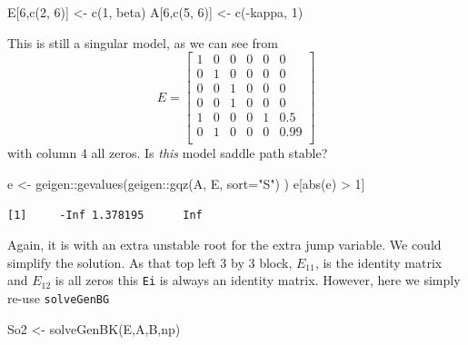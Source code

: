\documentclass[
  letterpaper,
]{book}
\newenvironment{Shaded}{\begin{snugshade}}{\end{snugshade}}
\newcommand{\AttributeTok}[1]{\textcolor[rgb]{0.40,0.45,0.13}{#1}}
\newcommand{\DecValTok}[1]{\textcolor[rgb]{0.68,0.00,0.00}{#1}}
\newcommand{\FunctionTok}[1]{\textcolor[rgb]{0.28,0.35,0.67}{#1}}
\newcommand{\NormalTok}[1]{\textcolor[rgb]{0.00,0.23,0.31}{#1}}
\newcommand{\OtherTok}[1]{\textcolor[rgb]{0.00,0.23,0.31}{#1}}
\newcommand{\SpecialCharTok}[1]{\textcolor[rgb]{0.37,0.37,0.37}{#1}}
\newcommand{\StringTok}[1]{\textcolor[rgb]{0.13,0.47,0.30}{#1}}
\begin{document}
\begin{Shaded}
\begin{Highlighting}[]
\NormalTok{E[}\DecValTok{6}\NormalTok{,}\FunctionTok{c}\NormalTok{(}\DecValTok{2}\NormalTok{, }\DecValTok{6}\NormalTok{)]     }\OtherTok{\textless{}{-}} \FunctionTok{c}\NormalTok{(}\DecValTok{1}\NormalTok{, beta)}
\NormalTok{A[}\DecValTok{6}\NormalTok{,}\FunctionTok{c}\NormalTok{(}\DecValTok{5}\NormalTok{, }\DecValTok{6}\NormalTok{)]     }\OtherTok{\textless{}{-}} \FunctionTok{c}\NormalTok{(}\SpecialCharTok{{-}}\NormalTok{kappa, }\DecValTok{1}\NormalTok{)}
\end{Highlighting}
\end{Shaded}

This is still a singular model, as we can see from \[  
E = \left[\begin{matrix}1 &0 &0 &0 &0 &0 \\0 &1 &0 &0 &0 &0 \\0 &0 &1 &0 &0 &0 \\0 &0 &1 &0 &0 &0 \\1 &0 &0 &0 &1 &0.5 \\0 &1 &0 &0 &0 &0.99 \\\end{matrix}\right] 
\] with column 4 all zeros. Is \emph{this} model saddle path stable?

\begin{Shaded}
\begin{Highlighting}[]
\NormalTok{e }\OtherTok{\textless{}{-}}\NormalTok{ geigen}\SpecialCharTok{::}\FunctionTok{gevalues}\NormalTok{(geigen}\SpecialCharTok{::}\FunctionTok{gqz}\NormalTok{(A, E, }\AttributeTok{sort=}\StringTok{"S"}\NormalTok{) )}
\NormalTok{e[}\FunctionTok{abs}\NormalTok{(e) }\SpecialCharTok{\textgreater{}} \DecValTok{1}\NormalTok{]}
\end{Highlighting}
\end{Shaded}

\begin{verbatim}
[1]     -Inf 1.378195      Inf
\end{verbatim}

Again, it is with an extra unstable root for the extra jump variable. We
could simplify the solution. As that top left 3 by 3 block, \(E_{11}\),
is the identity matrix and \(E_{12}\) is all zeros this \texttt{Ei} is
always an identity matrix. However, here we simply re-use
\texttt{solveGenBG}

\begin{Shaded}
\begin{Highlighting}[]
\NormalTok{So2 }\OtherTok{\textless{}{-}} \FunctionTok{solveGenBK}\NormalTok{(E,A,B,np)}
\end{Highlighting}
\end{Shaded}
\end{document}

